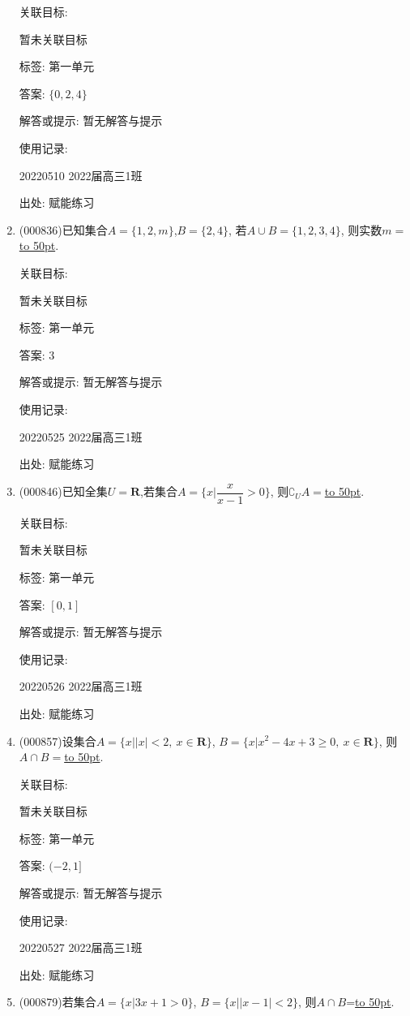 \documentclass[10pt,a4paper]{article}
\newcommand{\blank}[1]{\underline{\hbox to #1pt{}}}
\begin{document}
\begin{enumerate}[1.]
关联目标:

暂未关联目标



标签: 第一单元

答案: $\{0, 2, 4\}$

解答或提示: 暂无解答与提示

使用记录:

20220510	2022届高三1班	


出处: 赋能练习
\item { (000836)}已知集合$A=\{1,2,m\}$,$B=\{2,4\}$, 若$A\cup B=\{1,2,3,4\}$, 则实数$m=$\blank{50}.


关联目标:

暂未关联目标



标签: 第一单元

答案: $3$

解答或提示: 暂无解答与提示

使用记录:

20220525	2022届高三1班	


出处: 赋能练习
\item { (000846)}已知全集$U=\mathbf{R}$,若集合$A=\{x|\dfrac x{x-1}>0\}$, 则$\complement_U A=$\blank{50}.


关联目标:

暂未关联目标



标签: 第一单元

答案: $[0,1]$

解答或提示: 暂无解答与提示

使用记录:

20220526	2022届高三1班	


出处: 赋能练习
\item { (000857)}设集合$A=\{x||x|<2,\ x\in \mathbf{R}\}$, $B=\{x|x^2-4x+3\ge 0, \ x\in \mathbf{R}\}$, 则$A\cap B=$\blank{50}.


关联目标:

暂未关联目标



标签: 第一单元

答案: $(-2,1]$

解答或提示: 暂无解答与提示

使用记录:

20220527	2022届高三1班	


出处: 赋能练习
\item { (000879)}若集合$A=\{x|3x+1>0\}$, $B=\{x||x-1|<2\}$, 则$A\cap B$=\blank{50}.



\end{enumerate}
\end{document}

